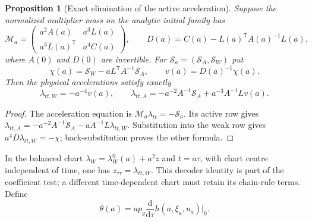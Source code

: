 \documentclass[11pt]{article}
\numberwithin{equation}{section}
\newtheorem{proposition}[proposition]{Proposition}
\theoremstyle{definition}
\theoremstyle{remark}
\newcommand{\dd}{\mathrm d}
\begin{document}
\begin{proposition}[Exact elimination of the active acceleration]
\label{prop:supp-finite-acc-schur}
Suppose the normalized multiplier mass on the analytic initial family has
\begin{equation}
 \mathcal M_a=\begin{pmatrix}
 a^2 A(a)&a^3 L(a)\\a^3L(a)^{\mathsf T}&a^4 C(a)
 \end{pmatrix},\qquad
 D(a)=C(a)-L(a)^{\mathsf T}A(a)^{-1}L(a),
 \label{eq:supp-finite-acc-mass}
\end{equation}
where $A(0)$ and $D(0)$ are invertible.  For
$\mathcal S_a=(\mathcal S_A,\mathcal S_W)$ put
\begin{equation}
 \chi(a)=\mathcal S_W-aL^{\mathsf T}A^{-1}\mathcal S_A,
 \qquad v(a)=D(a)^{-1}\chi(a).
 \label{eq:supp-finite-acc-effective}
\end{equation}
Then the physical accelerations satisfy exactly
\begin{equation}
 \lambda_{tt,W}=-a^{-4}v(a),\qquad
 \lambda_{tt,A}=-a^{-2}A^{-1}\mathcal S_A
                   +a^{-3}A^{-1}Lv(a).
 \label{eq:supp-finite-acc-elimination}
\end{equation}
\end{proposition}
\begin{proof}
The acceleration equation is $\mathcal M_a\lambda_{tt}=-\mathcal S_a$.
Its active row gives
$\lambda_{tt,A}=-a^{-2}A^{-1}\mathcal S_A-aA^{-1}L\lambda_{tt,W}$.
Substitution into the weak row gives $a^4D\lambda_{tt,W}=-\chi$;
back-substitution proves the other formula.
\end{proof}

In the balanced chart $\lambda_W=\lambda_W^0(a)+a^2z$ and $t=a\tau$,
with chart centre independent of time, one has
$z_{\tau\tau}=\lambda_{tt,W}$.  This decoder identity is part of the
coefficient test; a different time-dependent chart must retain its chain-rule
terms.  Define
\begin{equation}
 \theta(a)=a p_g\frac{\dd}{\dd\tau}h(a,\xi_a,u_a)\bigg|_0.
 \label{eq:supp-finite-acc-theta}
\end{equation}
\end{document}
